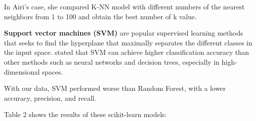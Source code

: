 In Airi's case, she compared K-NN model with different numbers of the nearest neighbors from 1 to 100 and obtain the best number of k value.

\textbf{Support vector machines (SVM)} are popular supervised learning methods that seeks to find the hyperplane that maximally separates the different classes in the input space. \cite{cortes1995support} stated that SVM can achieve higher classification accuracy than other methods such as neural networks and decision trees, especially in high-dimensional spaces.

With our data, SVM performed worse than Random Forest, with a lower accuracy, precision, and recall.

Table 2 shows the results of these scikit-learn models:

\begin{table}[H]
\centering
{}
\caption{\label{demo-table}Comparison Models' Results}
\end{table}
\raggedbottom

